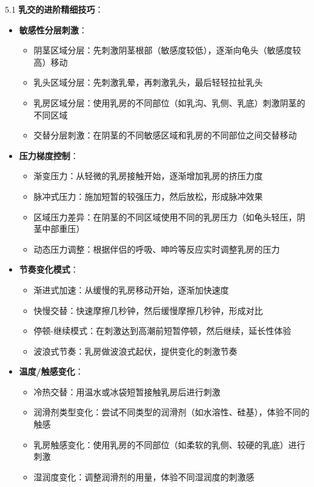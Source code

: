 \documentclass[12pt,UTF8]{ctexbook}
\begin{document}
5.1 \textbf{乳交的进阶精细技巧}：
\begin{itemize}
	\item \textbf{敏感性分层刺激}：
	\begin{itemize}
		\item 阴茎区域分层：先刺激阴茎根部（敏感度较低），逐渐向龟头（敏感度较高）移动
		\item 乳头区域分层：先刺激乳晕，再刺激乳头，最后轻轻拉扯乳头
		\item 乳房区域分层：使用乳房的不同部位（如乳沟、乳侧、乳底）刺激阴茎的不同区域
		\item 交替分层刺激：在阴茎的不同敏感区域和乳房的不同部位之间交替移动
	\end{itemize}
	\item \textbf{压力梯度控制}：
	\begin{itemize}
		\item 渐变压力：从轻微的乳房接触开始，逐渐增加乳房的挤压力度
		\item 脉冲式压力：施加短暂的较强压力，然后放松，形成脉冲效果
		\item 区域压力差异：在阴茎的不同区域使用不同的乳房压力（如龟头轻压，阴茎中部重压）
		\item 动态压力调整：根据伴侣的呼吸、呻吟等反应实时调整乳房的压力
	\end{itemize}
	\item \textbf{节奏变化模式}：
	\begin{itemize}
		\item 渐进式加速：从缓慢的乳房移动开始，逐渐加快速度
		\item 快慢交替：快速摩擦几秒钟，然后缓慢摩擦几秒钟，形成对比
		\item 停顿-继续模式：在刺激达到高潮前短暂停顿，然后继续，延长性体验
		\item 波浪式节奏：乳房做波浪式起伏，提供变化的刺激节奏
	\end{itemize}
	\item \textbf{温度/触感变化}：
	\begin{itemize}
		\item 冷热交替：用温水或冰袋短暂接触乳房后进行刺激
		\item 润滑剂类型变化：尝试不同类型的润滑剂（如水溶性、硅基），体验不同的触感
		\item 乳房触感变化：使用乳房的不同部位（如柔软的乳侧、较硬的乳底）进行刺激
		\item 湿润度变化：调整润滑剂的用量，体验不同湿润度的刺激感
	\end{itemize}
\end{itemize}
\end{document}
